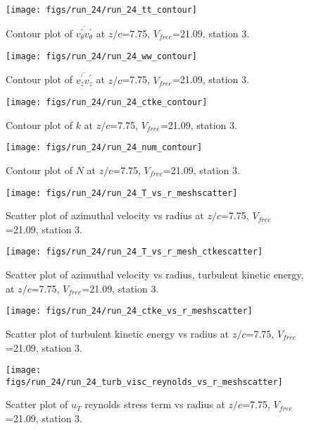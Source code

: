 \begin{figure}[H]
\centering
\texttt{[image: figs/run\_24/run\_24\_tt\_contour]}
\caption{Contour plot of $\overline{v_{\theta}^{\prime} v_{\theta}^{\prime}}$ at $z/c$=7.75, $V_{free}$=21.09, station 3.}
\end{figure}


\begin{figure}[H]
\centering
\texttt{[image: figs/run\_24/run\_24\_ww\_contour]}
\caption{Contour plot of $\overline{v_{z}^{\prime} v_{z}^{\prime}}$ at $z/c$=7.75, $V_{free}$=21.09, station 3.}
\end{figure}


\begin{figure}[H]
\centering
\texttt{[image: figs/run\_24/run\_24\_ctke\_contour]}
\caption{Contour plot of $k$ at $z/c$=7.75, $V_{free}$=21.09, station 3.}
\end{figure}


\begin{figure}[H]
\centering
\texttt{[image: figs/run\_24/run\_24\_num\_contour]}
\caption{Contour plot of $N$ at $z/c$=7.75, $V_{free}$=21.09, station 3.}
\end{figure}


\begin{figure}[H]
\centering
\texttt{[image: figs/run\_24/run\_24\_T\_vs\_r\_meshscatter]}
\caption{Scatter plot of azimuthal velocity vs radius at $z/c$=7.75, $V_{free}$=21.09, station 3.}
\end{figure}


\begin{figure}[H]
\centering
\texttt{[image: figs/run\_24/run\_24\_T\_vs\_r\_mesh\_ctkescatter]}
\caption{Scatter plot of azimuthal velocity vs radius, turbulent kinetic energy, at $z/c$=7.75, $V_{free}$=21.09, station 3.}
\end{figure}


\begin{figure}[H]
\centering
\texttt{[image: figs/run\_24/run\_24\_ctke\_vs\_r\_meshscatter]}
\caption{Scatter plot of turbulent kinetic energy vs radius at $z/c$=7.75, $V_{free}$=21.09, station 3.}
\end{figure}


\begin{figure}[H]
\centering
\texttt{[image: figs/run\_24/run\_24\_turb\_visc\_reynolds\_vs\_r\_meshscatter]}
\caption{Scatter plot of $
u_T$ reynolds stress term vs radius at $z/c$=7.75, $V_{free}$=21.09, station 3.}
\end{figure}


